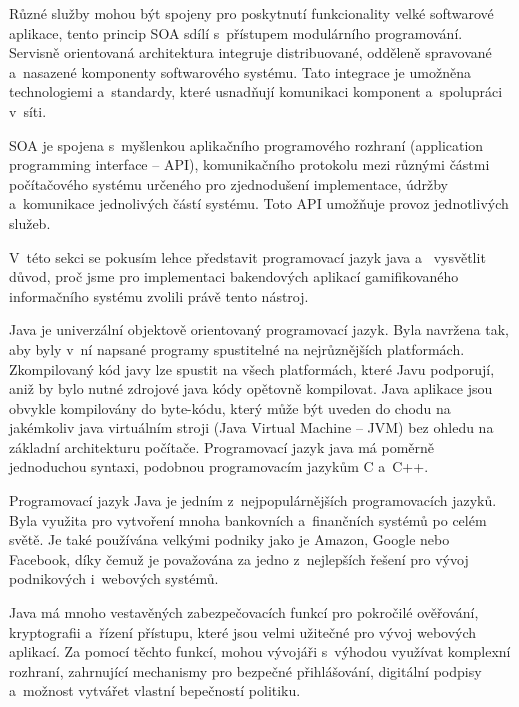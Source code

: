 \documentclass[12pt]{article}
\begin{document}
Různé služby mohou být spojeny pro poskytnutí funkcionality velké softwarové aplikace,
tento princip SOA sdílí s~přístupem modulárního programování. 
Servisně orientovaná architektura integruje distribuované,
odděleně spravované a~nasazené komponenty softwarového systému.
Tato integrace je umožněna technologiemi a~standardy, které usnadňují
komunikaci komponent a~spolupráci v~síti.

SOA je spojena s~myšlenkou aplikačního programového rozhraní
(application programming interface -- API), komunikačního protokolu mezi 
různými částmi počítačového systému určeného pro zjednodušení implementace, 
údržby a~komunikace jednolivých částí systému. 
Toto API umožňuje provoz jednotlivých služeb.

V~této sekci se pokusím lehce představit programovací jazyk java a~
vysvětlit důvod, proč jsme pro implementaci bakendových aplikací
gamifikovaného informačního systému zvolili právě tento nástroj.

Java
je univerzální objektově orientovaný programovací jazyk. 
Byla navržena tak, aby byly v~ní napsané programy spustitelné na nejrůznějších platformách.
Zkompilovaný kód javy lze spustit na všech platformách, které Javu podporují,
aniž by bylo nutné zdrojové java kódy opětovně kompilovat.
Java aplikace jsou obvykle kompilovány do byte-kódu, 
který může být uveden do chodu na jakémkoliv java virtuálním stroji
(Java Virtual Machine -- JVM) bez ohledu na základní architekturu počítače.
Programovací jazyk java má poměrně jednoduchou syntaxi, 
podobnou programovacím jazykům C a~C++. 

Programovací jazyk Java je jedním z~nejpopulárnějších programovacích jazyků.
Byla využita pro vytvoření mnoha bankovních a~finančních systémů po celém světě.
Je také používána velkými podniky jako je Amazon, Google nebo Facebook,
díky čemuž je považována za jedno z~nejlepších řešení pro vývoj podnikových i~webových systémů.

Java má mnoho vestavěných zabezpečovacích funkcí pro pokročilé ověřování,
kryptografii a~řízení přístupu, které jsou velmi užitečné pro vývoj webových aplikací.
Za pomocí těchto funkcí, mohou vývojáři s~výhodou využívat komplexní
rozhraní, zahrnující mechanismy pro bezpečné přihlášování, digitální podpisy a~možnost vytvářet vlastní bepečností politiku.
\end{document}
